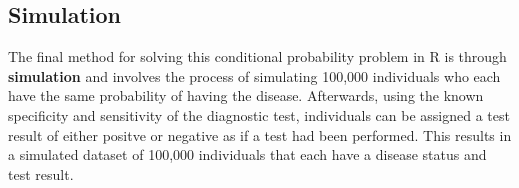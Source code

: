 \subsection{Simulation}


The final method for solving this conditional probability problem in \textsf{R} is through \textbf{simulation} and involves the process of simulating 100,000 individuals who each have the same probability of having the disease.  Afterwards, using the known specificity and sensitivity of the diagnostic test, individuals can be assigned a test result of either positve or negative as if a test had been performed.  This results in a simulated dataset of 100,000 individuals that each have a disease status and test result. 

